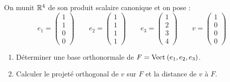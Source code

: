 \begin{exoex}
On munit \(\mathbb{R}^4\) de son produit scalaire canonique et on pose : \[e_1=\begin{pmatrix}
1 \\ 1 \\ 0 \\ 0
\end{pmatrix}\qquad e_2=\begin{pmatrix}
1 \\ 1 \\ 1 \\ 1
\end{pmatrix}\qquad e_3=\begin{pmatrix}
1 \\ 2 \\ 3 \\ 4
\end{pmatrix}\qquad v=\begin{pmatrix}
1 \\ 0 \\ 0 \\ 0
\end{pmatrix}\]

\begin{enumerate}
    \item Déterminer une base orthonormale de \(F=\Vect{e_1,e_2,e_3}\). \\
    \item Calculer le projeté orthogonal de \(v\) sur \(F\) et la distance de \(v\) à \(F\).
\end{enumerate}
\end{exoex}


